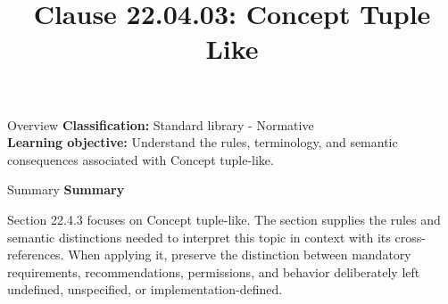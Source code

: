 \documentclass[10pt,letterpaper]{article}
\title{Clause 22.04.03: Concept Tuple Like}
\author{}
\date{}
\begin{document}
\maketitle
\begin{CornellOverviewBox}{Overview}
\textbf{Classification:} Standard library - Normative\\[2pt]
\textbf{Learning objective:} Understand the rules, terminology, and semantic consequences associated with Concept tuple-like.
\end{CornellOverviewBox}\begin{CornellSummaryBox}{Summary}
{\sffamily\bfseries\color{Accent} Summary}\par\vspace{3pt}Section 22.4.3 focuses on Concept tuple-like. The section supplies the rules and semantic distinctions needed to interpret this topic in context with its cross-references. When applying it, preserve the distinction between mandatory requirements, recommendations, permissions, and behavior deliberately left undefined, unspecified, or implementation-defined.
\end{CornellSummaryBox}
\end{document}
